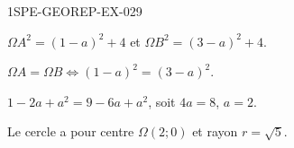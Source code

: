 \begin{corrige}{1SPE-GEOREP-EX-029}


$\Omega A^2 = (1 - a)^2 + 4$ et $\Omega B^2 = (3 - a)^2 + 4$.

$\Omega A = \Omega B \iff (1 - a)^2 = (3 - a)^2$.

$1 - 2a + a^2 = 9 - 6a + a^2$, soit $4a = 8$, $\boxed{a = 2}$.

Le cercle a pour centre $\Omega(2 ; 0)$ et rayon $r = \sqrt{5}$.

\end{corrige}
